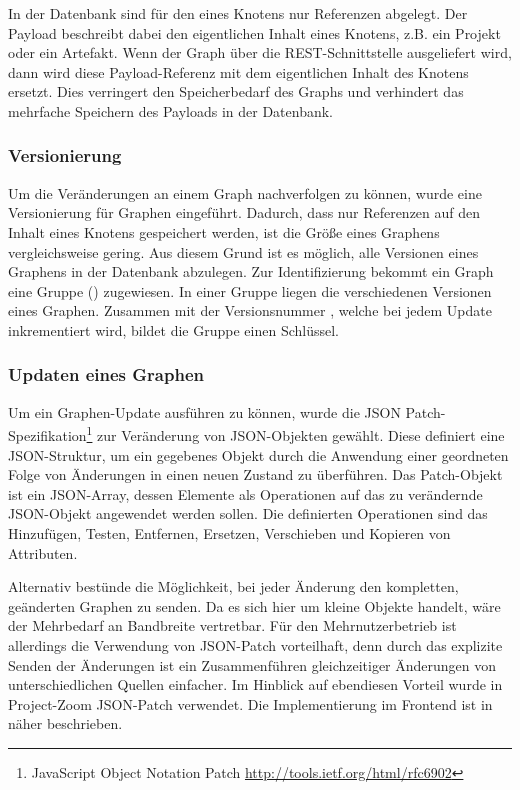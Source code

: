 In der Datenbank sind für den  eines Knotens nur Referenzen abgelegt. Der Payload beschreibt dabei den eigentlichen Inhalt eines Knotens, z.B. ein Projekt oder ein Artefakt. Wenn der Graph über die REST-Schnittstelle ausgeliefert wird, dann wird diese Payload-Referenz mit dem eigentlichen Inhalt des Knotens ersetzt. Dies verringert den Speicherbedarf des Graphs und verhindert das mehrfache Speichern des Payloads in der Datenbank.

\subsubsection{Versionierung}

Um die Veränderungen an einem Graph nachverfolgen zu können, wurde eine Versionierung für Graphen eingeführt. Dadurch, dass nur Referenzen auf den Inhalt eines Knotens gespeichert werden, ist die Größe eines Graphens vergleichsweise gering. Aus diesem Grund ist es möglich, alle Versionen eines Graphens in der Datenbank abzulegen. Zur Identifizierung bekommt ein Graph eine Gruppe () zugewiesen. In einer Gruppe liegen die verschiedenen Versionen eines Graphen. Zusammen mit der Versionsnummer , welche bei jedem Update inkrementiert wird, bildet die Gruppe einen Schlüssel.

\subsubsection{Updaten eines Graphen}

Um ein Graphen-Update ausführen zu können, wurde die JSON Patch-Spezifikation\footnote{JavaScript Object Notation Patch \url{http://tools.ietf.org/html/rfc6902}} zur Veränderung von JSON-Objekten gewählt. Diese definiert eine JSON-Struktur, um ein gegebenes Objekt durch die Anwendung einer geordneten Folge von Änderungen in einen neuen Zustand zu überführen. Das Patch-Objekt ist ein JSON-Array, dessen Elemente als Operationen auf das zu verändernde JSON-Objekt angewendet werden sollen. Die definierten Operationen sind das Hinzufügen, Testen, Entfernen, Ersetzen, Verschieben und Kopieren von Attributen.

Alternativ bestünde die Möglichkeit, bei jeder Änderung den kompletten, geänderten Graphen zu senden. Da es sich hier um kleine Objekte handelt, wäre der Mehrbedarf an Bandbreite vertretbar. Für den Mehrnutzerbetrieb ist allerdings die Verwendung von JSON-Patch vorteilhaft, denn durch das explizite Senden der Änderungen ist ein Zusammenführen gleichzeitiger Änderungen von unterschiedlichen Quellen einfacher. Im Hinblick auf ebendiesen Vorteil wurde in Project-Zoom JSON-Patch verwendet. Die Implementierung im Frontend ist in \cite{bp-norman} näher beschrieben.

